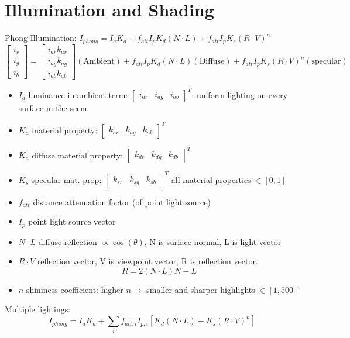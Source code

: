 \documentclass[8pt,twocolumn]{extarticle}
\begin{document}
\section*{Illumination and Shading}
Phong Illumination: $I_{phong} = I_aK_a + f_{att}I_pK_d(N\cdot L) + f_{att}I_pK_s(R\cdot V)^n$
\[\begin{bmatrix}
  i_r \\ 
  i_g \\ 
  i_b
\end{bmatrix} = \begin{bmatrix}
    i_{ar}k_{ar}\\i_{ag}k_{ag}\\i_{ab}k_{ab} 
  \end{bmatrix} (\text{Ambient}) + f_{att}I_pK_d(N\cdot L) (\text{Diffuse}) + f_{att}I_pK_s(R\cdot V)^n (\text{specular})
\]
\begin{itemize}
  \item $I_a$ luminance in ambient term: $\begin{bmatrix}
    i_{ar}&i_{ag}&i_{ab} 
  \end{bmatrix}^T$: uniform lighting on every surface in the scene
  \item $K_a$ material property: $\begin{bmatrix}
    k_{ar}&k_{ag}&k_{ab} 
  \end{bmatrix}^T$
  \item $K_a$ diffuse material property: $\begin{bmatrix}
    k_{dr}&k_{dg}&k_{db} 
  \end{bmatrix}^T $ 
  \item $K_s$ specular mat. prop: $\begin{bmatrix}
    k_{sr}&k_{sg}&k_{sb} 
  \end{bmatrix}^T $ all material properties $\in [0, 1]$
  \item $f_{att}$ distance attenuation factor (of point light source)
  \item $I_p$ point light source vector
  \item $N \cdot L$ diffuse reflection $\propto \cos(\theta)$, N is surface normal, L is light vector
  \item $R\cdot V$ reflection vector, V is viewpoint vector, R is reflection vector. \[R = 2(N\cdot L)N - L\]
  \item $n$ shininess coefficient: higher $n \rightarrow$ smaller and sharper highlights $\in [1, 500]$
\end{itemize}
Multiple lightings: \[I_{phong} = I_aK_a + \sum_i f_{att, i}I_{p, i}[K_d(N\cdot L) + K_s(R\cdot V)^n]\]
\end{document}
